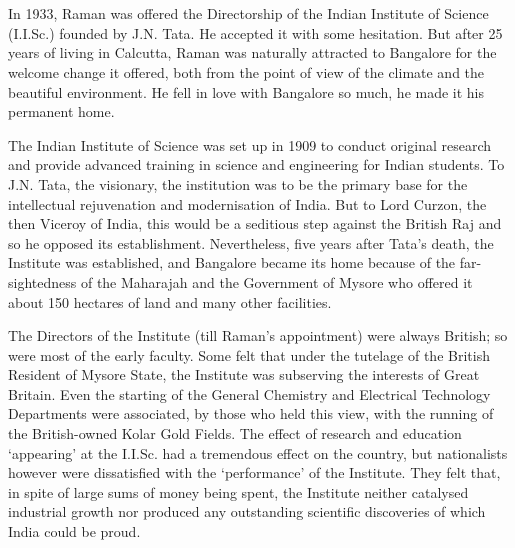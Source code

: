 \chapter{}\label{chap2}

\smallskip
{}


\noindent
In 1933, Raman was offered the Directorship of the Indian
Institute of Science (I.I.Sc.) founded by J.N. Tata. He accepted it with
some hesitation. But after 25 years of living in Calcutta, Raman
was naturally attracted to Bangalore for the welcome change it
offered, both from the point of view of the climate and the
beautiful environment. He fell in love with Bangalore so much,
he made it his permanent home.


The Indian Institute of Science was set up in 1909 to conduct
original research and provide advanced training in science and
engineering for Indian students. To J.N. Tata, the visionary, the
institution was to be the primary base for the intellectual
rejuvenation and modernisation of India. But to Lord Curzon,
the then Viceroy of India, this would be a seditious step against
the British Raj and so he opposed its establishment. Nevertheless,
five years after Tata's death, the Institute was established, and
Bangalore became its home because of the far-sightedness of the
Maharajah and the Government of Mysore who offered it about
150 hectares of land and many other facilities.

The Directors of the Institute (till Raman's appointment)
were always British; so were most of the early faculty. Some felt
that under the tutelage of the British Resident of Mysore State,
the Institute was subserving the interests of Great Britain. Even
the \hbox{starting} of the General Chemistry and Electrical Technology
Departments were associated, by those who held this view, with
the running of the British-owned Kolar Gold Fields. The effect
of research and education `appearing' at the I.I.Sc. had a
tremendous effect on the country, but nationalists however were
dissatisfied with the `performance' of the Institute. They felt that,
in spite of large sums of money being spent, the Institute neither
catalysed industrial growth nor produced any outstanding
scientific discoveries of which India could be proud.

